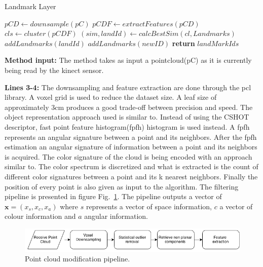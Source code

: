 \documentclass[twoside,hidelinks]{article}
\begin{document}
\begin{algorithm}
  \caption{Landmark Layer}\label{euclid}
  \begin{algorithmic}[1]
      \State $pCD \gets downsample(pC)$ 
      \State $pCDF \gets extractFeatures(pCD)$
      \State $cls \gets cluster(pCDF)$  
	      \State $ (sim, landId) \gets calcBestSim(cl, Landmarks) $
			   \State $ addLandmarks(landId)$
			\Else 
			   \State $addLandmarks(newID)$
			\EndIf
      \EndFor
      \State \textbf{return} $ landMarkIds$
    \EndProcedure
  \end{algorithmic}
\end{algorithm}


\textbf{Method input:} The method takes as input a pointcloud(pC) as it is currently being read by the kinect sensor.

\textbf{Lines 3-4:} The downsampling and feature extraction are done through the pcl\cite{pcl} library. A voxel grid is used to reduce the dataset size. A leaf size of approximately 3cm produces a good trade-off between precision and speed. The object representation approach used is similar to\cite{objectpointSLAM}. Instead of using the CSHOT descriptor, fast point feature histogram(fpfh)\cite{fpfh} histogram is used instead. A fpfh represents an angular signature between a point and its neighbors. After the fpfh estimation an angular signature of information between a point and its neighbors is acquired. The color signature of the cloud is being encoded with an approach similar to\cite{smcddp}. The color spectrum is discretized and what is extracted is the count of different color signatures between a point and its k nearest neighbors. Finally the position of every point is also given as input to the algorithm. The filtering pipeline is presented in figure Fig.~\ref{pcl:mod}. The pipeline outputs a vector of $ \textbf{x} = (x_s, x_c, x_a) $  where $s$ represents a vector of space information, $c$ a vector of colour information and $a$ angular information. 

\begin{figure}[ht!]
  \centering
    \includegraphics[width=1\textwidth]{Basic}
  \caption{Point cloud modification pipeline.}
  \label{pcl:mod}
\end{figure}
\end{document}

